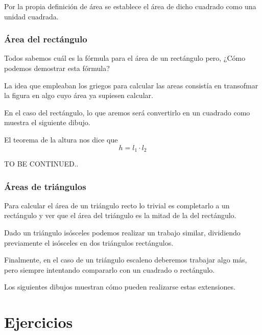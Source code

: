 \documentclass{apuntes}
\begin{document}
Por la propia definición de área se establece el área de dicho cuadrado como una unidad cuadrada.

\subsection{Área del rectángulo}

Todos sabemos cuál es la fórmula para el área de un rectángulo pero, ¿Cómo podemos demostrar esta fórmula?

La idea que empleaban los griegos para calcular las areas consistía en transofmar la figura en algo cuyo área ya supiesen calcular.

En el caso del rectángulo, lo que aremos será convertirlo en un cuadrado como muestra el siguiente dibujo.

\begin{minipage}{0.4\textwidth}
\begin{center}
\end{center}
\end{minipage}
\begin{minipage}{0.55\textwidth}
El teorema de la altura nos dice que 
\[h=l_1\cdot l_2\]

TO BE CONTINUED..
\end{minipage}

\subsection{Áreas de triángulos}

Para calcular el área de un triángulo recto lo trivial es completarlo a un rectángulo y ver que el área del triángulo es la mitad de la del rectángulo.

Dado un triángulo isósceles podemos realizar un trabajo similar, dividiendo previamente el isósceles en dos triángulos rectángulos.

Finalmente, en el caso de un triángulo escaleno deberemos trabajar algo más, pero siempre intentando compararlo con un cuadrado o rectángulo.

Los siguientes dibujos muestran cómo pueden realizarse estas extensiones.

\appendix
\chapter{Ejercicios}

\printindex
\end{document}
